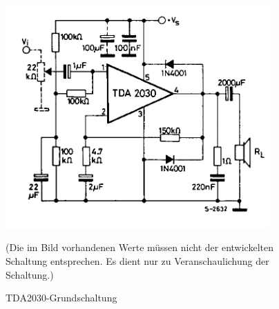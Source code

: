 \begin{figure} [H]
	\centering
	\includegraphics[width=0.9\textwidth]{img/Grundlagen/TDA2030/TDA2030-Grundschaltung.png}
	\caption[TDA2030-Grundschaltung]{TDA2030-Grundschaltung\footnotemark}
	\text (Die im Bild vorhandenen Werte müssen nicht der entwickelten Schaltung entsprechen. Es dient nur zu Veranschaulichung der Schaltung.)
	\label {fig:8.3.2.1}
\end{figure}

